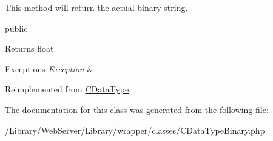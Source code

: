 This method will return the actual binary string.

public \begin{DoxyReturn}{Returns}
float
\end{DoxyReturn}

\begin{DoxyExceptions}{Exceptions}
{\em Exception} & \\
\hline
\end{DoxyExceptions}


Reimplemented from \hyperlink{class_c_data_type_a6f013843044529b54c2df535fc1471a8}{C\-Data\-Type}.



The documentation for this class was generated from the following file\-:\begin{DoxyCompactItemize}
\item 
/\-Library/\-Web\-Server/\-Library/wrapper/classes/C\-Data\-Type\-Binary.\-php\end{DoxyCompactItemize}
